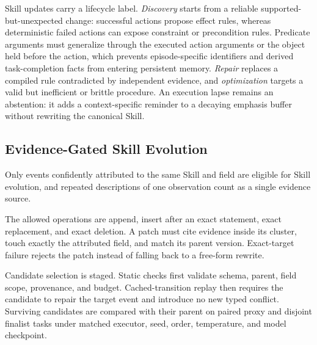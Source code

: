 {\color{red}Skill updates carry a lifecycle label. \emph{Discovery} starts from a reliable supported-but-unexpected change: successful actions propose effect rules, whereas deterministic failed actions can expose constraint or precondition rules. Predicate arguments must generalize through the executed action arguments or the object held before the action, which prevents episode-specific identifiers and derived task-completion facts from entering persistent memory. \emph{Repair} replaces a compiled rule contradicted by independent evidence, and \emph{optimization} targets a valid but inefficient or brittle procedure.} An execution lapse remains an abstention: it adds a context-specific reminder to a decaying emphasis buffer without rewriting the canonical Skill.

\subsection{Evidence-Gated Skill Evolution}

Only events confidently attributed to the same Skill and field are eligible for Skill evolution, and repeated descriptions of one observation count as a single evidence source. 

 The allowed operations are append, insert after an exact statement, exact replacement, and exact deletion. A patch must cite evidence inside its cluster, touch exactly the attributed field, and match its parent version. Exact-target failure rejects the patch instead of falling back to a free-form rewrite. 

Candidate selection is staged. Static checks first validate schema, parent, field scope, provenance, and budget. Cached-transition replay then requires the candidate to repair the target event and introduce no new typed conflict.  Surviving candidates are compared with their parent on paired proxy and disjoint finalist tasks under matched executor, seed, order, temperature, and model checkpoint. 

